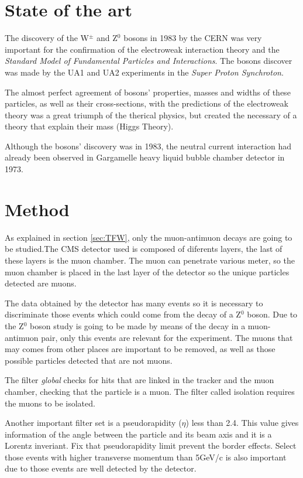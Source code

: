 \documentclass[twoside]{article}
\begin{document}
\begin{multicols}{2}
		\section{State of the art}

			The discovery of the W$^{\pm}$ and Z$^0$ bosons in 1983 by the CERN was very important for the confirmation of the electroweak interaction theory and the \textit{Standard Model of Fundamental Particles and Interactions}. The bosons discover was made by the UA1 and UA2 experiments in the \textit{Super Proton Synchroton}.

			The almost perfect agreement of bosons' properties, masses and widths of these particles, as well as their cross-sections, with the predictions of the electroweak theory was a great triumph of the therical physics, but created the necessary of a theory that explain their mass (Higgs Theory).

			Although the bosons' discovery was in 1983, the neutral current interaction had already been observed in Gargamelle heavy liquid bubble chamber detector in 1973.

		\section{Method}

			As explained in section \ref{sec:TFW}, only the muon-antimuon decays are going to be studied.The CMS detector used is composed of diferents layers, the last of these layers is the muon chamber. The muon can penetrate various meter, so the muon chamber is placed in the last layer of the detector so the unique particles detected are muons.

			The data obtained by the detector has many events so it is necessary to discriminate those events which could come from the decay of a Z$^0$ boson. Due to the Z$^0$ boson study is going to be made by means of the decay in a muon-antimuon pair, only this events are relevant for the experiment. The muons that may comes from other places are important to be removed, as well as those possible particles detected that are not muons.

			The filter \textit{global} checks for hits that are linked in the tracker and the muon chamber, checking that the particle is a muon. The filter called isolation requires the muons to be isolated.

			Another important filter set is a pseudorapidity ($\eta$) less than 2.4. This value gives information of the angle between the particle and its beam axis and it is a Lorentz inveriant. Fix that pseudorapidity limit prevent the border effects. Select those events with higher transverse momentum than 5GeV/c is also important due to those events are well detected by the detector.


\end{multicols}
\end{document}
